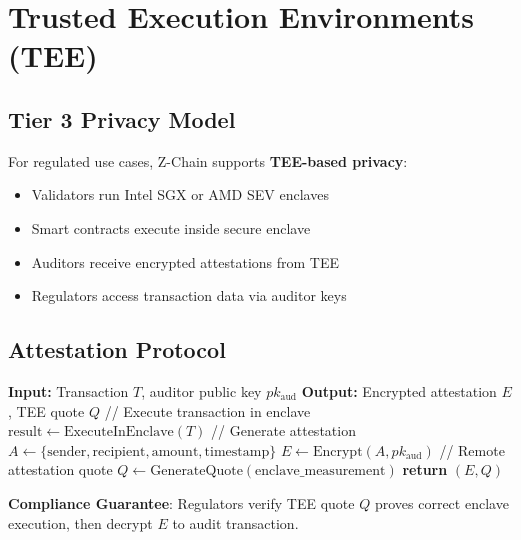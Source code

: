 \section{Trusted Execution Environments (TEE)}


\subsection{Tier 3 Privacy Model}

For regulated use cases, Z-Chain supports \textbf{TEE-based privacy}:

\begin{itemize}[leftmargin=1.1em]
  \item Validators run Intel SGX or AMD SEV enclaves
  \item Smart contracts execute inside secure enclave
  \item Auditors receive encrypted attestations from TEE
  \item Regulators access transaction data via auditor keys
\end{itemize}

\subsection{Attestation Protocol}

\begin{algorithm}[H]
\caption{TEE Transaction Attestation}
\begin{algorithmic}[1]
\State \textbf{Input:} Transaction $T$, auditor public key $pk_{\text{aud}}$
\State \textbf{Output:} Encrypted attestation $E$, TEE quote $Q$
\State
\State // Execute transaction in enclave
\State $\text{result} \leftarrow \text{ExecuteInEnclave}(T)$
\State
\State // Generate attestation
\State $A \leftarrow \{\text{sender}, \text{recipient}, \text{amount}, \text{timestamp}\}$
\State $E \leftarrow \text{Encrypt}(A, pk_{\text{aud}})$ 
\State
\State // Remote attestation quote
\State $Q \leftarrow \text{GenerateQuote}(\text{enclave\_measurement})$
\State \textbf{return} $(E, Q)$
\end{algorithmic}
\end{algorithm}

\textbf{Compliance Guarantee}: Regulators verify TEE quote $Q$ proves correct enclave execution, then decrypt $E$ to audit transaction.

